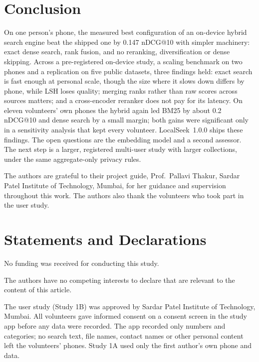 \documentclass[pdflatex,sn-basic,Numbered]{sn-jnl}
\makeatletter
\newcommand{\ndcg}{nDCG@10}
\makeatother
\begin{document}
\section{Conclusion}

On one person's phone, the measured best configuration of an on-device hybrid search engine beat the shipped one by 0.147 \ndcg{} with simpler machinery: exact dense search, rank fusion, and no reranking, diversification or dense skipping. Across a pre-registered on-device study, a scaling benchmark on two phones and a replication on five public datasets, three findings held: exact search is fast enough at personal scale, though the size where it slows down differs by phone, while LSH loses quality; merging ranks rather than raw scores across sources matters; and a cross-encoder reranker does not pay for its latency. On eleven volunteers' own phones the hybrid again led BM25 by about 0.2 \ndcg{} and dense search by a small margin; both gains were significant only in a sensitivity analysis that kept every volunteer. LocalSeek~1.0.0 ships these findings. The open questions are the embedding model and a second assessor. The next step is a larger, registered multi-user study with larger collections, under the same aggregate-only privacy rules.

\backmatter

The authors are grateful to their project guide, Prof.\ Pallavi Thakur, Sardar Patel Institute of Technology, Mumbai, for her guidance and supervision throughout this work. The authors also thank the volunteers who took part in the user study.

\section*{Statements and Declarations}

 No funding was received for conducting this study.

 The authors have no competing interests to declare that are relevant to the content of this article.

 The user study (Study 1B) was approved by Sardar Patel Institute of Technology, Mumbai. All volunteers gave informed consent on a consent screen in the study app before any data were recorded. The app recorded only numbers and categories; no search text, file names, contact names or other personal content left the volunteers' phones. Study 1A used only the first author's own phone and data.
\end{document}
